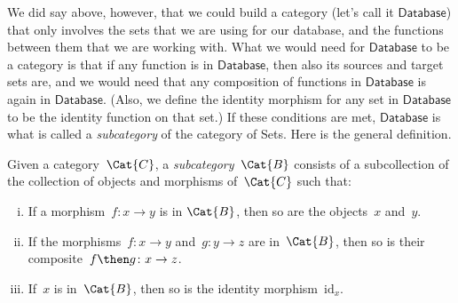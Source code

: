 We did say above, however, that we could build a category (let's call it $\mathsf{Database}$) that only involves the sets that we are using for our database, and the functions between them that we are working with. What we would need for $\mathsf{Database}$ to be a category is that if any function is in $\mathsf{Database}$, then also its sources and target sets are, and we would need that any composition of functions in $\mathsf{Database}$ is again in $\mathsf{Database}$. (Also, we define the identity morphism for any set in $\mathsf{Database}$ to be the identity function on that set.) If these conditions are met, $\mathsf{Database}$ is what is called a \emph{subcategory} of the category of Sets. Here is the general definition. 

\begin{shaded*}
\begin{definition}[Subcategory]
\label{def:subcategory}
	Given a category~$\Cat{C}$, a \emph{subcategory}~$\Cat{B}$ consists of a subcollection of the collection of objects and morphisms of~$\Cat{C}$ such that:
	\begin{enumerate}[(i)]
	\item If a morphism~$f \colon x\to y$ is in $\Cat{B}$, then so are the objects~$x$ and~$y$.
	\item If the morphisms~$f\colon x\to y$ and~$g\colon y\to z$ are in~$\Cat{B}$, then so is their composite~$f\then g\colon x\to z$.
	\item If~$x$ is in~$\Cat{B}$, then so is the identity morphism~$\text{id}_x$.
	\end{enumerate}
\end{definition}
\end{shaded*}


